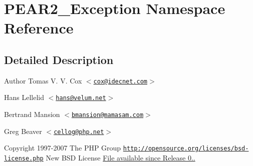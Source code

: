 \hypertarget{namespace_p_e_a_r2___exception}{
\section{\-P\-E\-A\-R2\-\_\-\-Exception \-Namespace \-Reference}
\label{namespace_p_e_a_r2___exception}
}


\subsection{\-Detailed \-Description}
\begin{DoxyAuthor}{\-Author}
\-Tomas \-V. \-V. \-Cox $<$\href{mailto:cox@idecnet.com}{\tt cox@idecnet.\-com}$>$ 

\-Hans \-Lellelid $<$\href{mailto:hans@velum.net}{\tt hans@velum.\-net}$>$ 

\-Bertrand \-Mansion $<$\href{mailto:bmansion@mamasam.com}{\tt bmansion@mamasam.\-com}$>$ 

\-Greg \-Beaver $<$\href{mailto:cellog@php.net}{\tt cellog@php.\-net}$>$ 
\end{DoxyAuthor}
\begin{DoxyCopyright}{\-Copyright}
1997-\/2007 \-The \-P\-H\-P \-Group  \href{http://opensource.org/licenses/bsd-license.php}{\tt http\-://opensource.\-org/licenses/bsd-\/license.\-php} \-New \-B\-S\-D \-License \hyperlink{}{\-File available since \-Release 0.. }
\end{DoxyCopyright}
